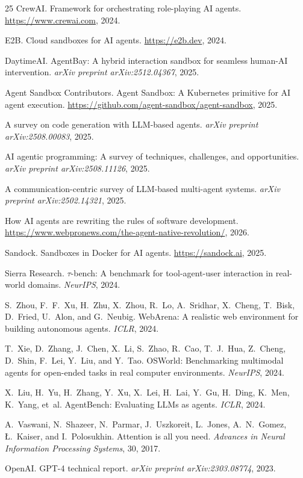 \begin{thebibliography}{25}
CrewAI.
Framework for orchestrating role-playing AI agents.
\url{https://www.crewai.com}, 2024.

E2B.
Cloud sandboxes for AI agents.
\url{https://e2b.dev}, 2024.

DaytimeAI.
AgentBay: A hybrid interaction sandbox for seamless human-AI intervention.
\textit{arXiv preprint arXiv:2512.04367}, 2025.

Agent Sandbox Contributors.
Agent Sandbox: A Kubernetes primitive for AI agent execution.
\url{https://github.com/agent-sandbox/agent-sandbox}, 2025.

A survey on code generation with LLM-based agents.
\textit{arXiv preprint arXiv:2508.00083}, 2025.

AI agentic programming: A survey of techniques, challenges, and opportunities.
\textit{arXiv preprint arXiv:2508.11126}, 2025.

A communication-centric survey of LLM-based multi-agent systems.
\textit{arXiv preprint arXiv:2502.14321}, 2025.

How AI agents are rewriting the rules of software development.
\url{https://www.webpronews.com/the-agent-native-revolution/}, 2026.

Sandock.
Sandboxes in Docker for AI agents.
\url{https://sandock.ai}, 2025.

Sierra Research.
$\tau$-bench: A benchmark for tool-agent-user interaction in real-world domains.
\textit{NeurIPS}, 2024.

S.~Zhou, F.~F.~Xu, H.~Zhu, X.~Zhou, R.~Lo, A.~Sridhar, X.~Cheng, T.~Bisk, D.~Fried, U.~Alon, and G.~Neubig.
WebArena: A realistic web environment for building autonomous agents.
\textit{ICLR}, 2024.

T.~Xie, D.~Zhang, J.~Chen, X.~Li, S.~Zhao, R.~Cao, T.~J.~Hua, Z.~Cheng, D.~Shin, F.~Lei, Y.~Liu, and Y.~Tao.
OSWorld: Benchmarking multimodal agents for open-ended tasks in real computer environments.
\textit{NeurIPS}, 2024.

X.~Liu, H.~Yu, H.~Zhang, Y.~Xu, X.~Lei, H.~Lai, Y.~Gu, H.~Ding, K.~Men, K.~Yang, et~al.
AgentBench: Evaluating LLMs as agents.
\textit{ICLR}, 2024.

A.~Vaswani, N.~Shazeer, N.~Parmar, J.~Uszkoreit, L.~Jones, A.~N.~Gomez, {\L}.~Kaiser, and I.~Polosukhin.
Attention is all you need.
\textit{Advances in Neural Information Processing Systems}, 30, 2017.

OpenAI.
GPT-4 technical report.
\textit{arXiv preprint arXiv:2303.08774}, 2023.

\end{thebibliography}
